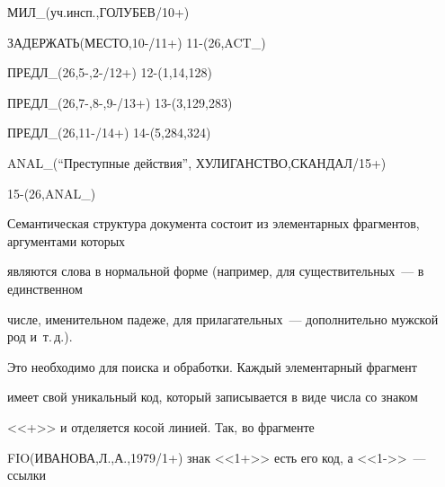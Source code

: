 {     


\noindent


     МИЛ\_(уч.инсп.,ГОЛУБЕВ/10+) 


     


\noindent


     ЗАДЕРЖАТЬ(МЕСТО,10-/11+) 11-(26,ACT\_)


     


\noindent


     ПРЕДЛ\_(26,5-,2-/12+) 12-(1,14,128)


     


\noindent


     ПРЕДЛ\_(26,7-,8-,9-/13+) 13-(3,129,283)


     





\noindent


     ПРЕДЛ\_(26,11-/14+) 14-(5,284,324)


     


\noindent


     ANAL\_(``Преступные действия'', ХУЛИГАНСТВО,СКАНДАЛ/15+)


     


\noindent


     15-(26,ANAL\_)


}    





\smallskip





    Семантическая структура документа состоит из элементарных фрагментов, аргументами которых 


являются слова в нормальной форме (например, для существительных~--- в единственном 


чис\-ле, именительном падеже, для прилагательных~--- дополнительно мужской род и~т.\,д.). 


Это необходимо для поиска и обработки. Каждый элементарный фрагмент 


имеет свой уникальный код, который записывается в виде числа со знаком 


<<+>> и отделяется косой линией. Так, во фрагменте 


FIO(ИВАНОВА,Л.,А.,1979/1+) знак <<1+>> есть его код, а <<1->>~--- ссылки 


